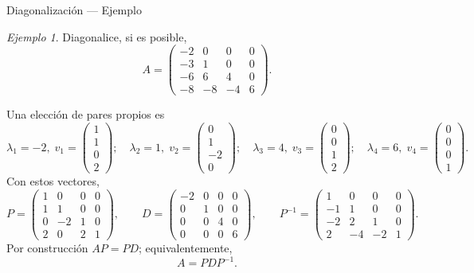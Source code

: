 \documentclass[aspectratio=169,11pt]{beamer}
\theoremstyle{remark}
\newtheorem{Ejem}[definicion]{Ejemplo}
\begin{document}
\begin{frame}[shrink=5]{Diagonalización — Ejemplo}
\footnotesize
\begin{Ejem}


Diagonalice, si es posible,
\[
A=\begin{pmatrix}-2 & 0 & 0 & 0\\-3 & 1 & 0 & 0\\-6 & 6 & 4 & 0\\-8 & -8 & -4 & 6\end{pmatrix}.
\]

\scriptsize
Una elección de pares propios es
\[
\lambda_1=-2,\;v_1=\begin{pmatrix}1\\1\\0\\2\end{pmatrix};\quad \lambda_2=1,\;v_2=\begin{pmatrix}0\\1\\-2\\0\end{pmatrix};\quad \lambda_3=4,\;v_3=\begin{pmatrix}0\\0\\1\\2\end{pmatrix};\quad \lambda_4=6,\;v_4=\begin{pmatrix}0\\0\\0\\1\end{pmatrix}.
\]
Con estos vectores,
\[
P=\begin{pmatrix}1 & 0 & 0 & 0\\1 & 1 & 0 & 0\\0 & -2 & 1 & 0\\2 & 0 & 2 & 1\end{pmatrix},\qquad D=\begin{pmatrix}-2 & 0 & 0 & 0\\0 & 1 & 0 & 0\\0 & 0 & 4 & 0\\0 & 0 & 0 & 6\end{pmatrix},\qquad P^{-1}=\begin{pmatrix}1 & 0 & 0 & 0\\-1 & 1 & 0 & 0\\-2 & 2 & 1 & 0\\2 & -4 & -2 & 1\end{pmatrix}.
\]
Por construcción $AP=PD$; equivalentemente,
\[
\boxed{A=PDP^{-1}}.
\]

\end{Ejem}
\end{frame}
\end{document}
